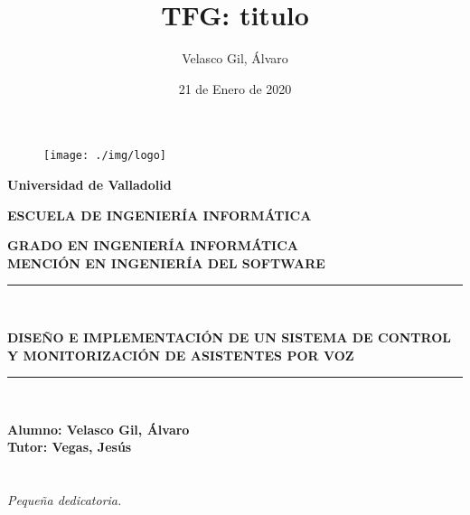 \documentclass[openright,twoside,10pt]{book}
\date{21 de Enero de 2020}
\author{Velasco Gil, Álvaro}
\title{TFG: titulo}
\begin{document}
\begin{titlepage}

\begin{center}
\vspace*{-1in}
\begin{figure}[htb]
\begin{center}
\texttt{[image: ./img/logo]}
\end{center}
\end{figure}
\begin{large}
\textbf{Universidad de Valladolid}
\end{large}

\vspace*{0.15in}

\vspace*{0.6in}
\begin{large}
\textbf{ESCUELA DE INGENIERÍA INFORMÁTICA}

\end{large}
\vspace*{0.2in}
\textbf{ GRADO EN INGENIERÍA INFORMÁTICA}\\
\textbf{ MENCIÓN EN INGENIERÍA DEL SOFTWARE }
\vspace*{0.1in}
\rule{140mm}{0.1mm}\\
\vspace*{0.2in}
\begin{large}
\textbf{{\LARGE DISEÑO E IMPLEMENTACIÓN DE UN SISTEMA DE CONTROL Y MONITORIZACIÓN DE ASISTENTES POR VOZ\\}}
\end{large}
\vspace*{0.2in}
\rule{140mm}{0.1mm}\\
\vspace*{2in}
\begin{large}
\begin{flushright}
\textbf{Alumno: Velasco Gil, Álvaro \\
\vspace*{0.3in}
Tutor: Vegas, Jesús }
\end{flushright}
\end{large}
\end{center}

\end{titlepage}

\newpage
\mbox{}	
\thispagestyle{empty} %

\chapter*{}
\begin{flushright}
\textit{%
Pequeña dedicatoria.}
\end{flushright}
\end{document}
